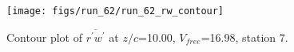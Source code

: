 \begin{figure}[H]
\centering
\texttt{[image: figs/run\_62/run\_62\_rw\_contour]}
\caption{Contour plot of $\overline{r^\prime w^\prime}$ at $z/c$=10.00, $V_{free}$=16.98, station 7.}
\end{figure}


